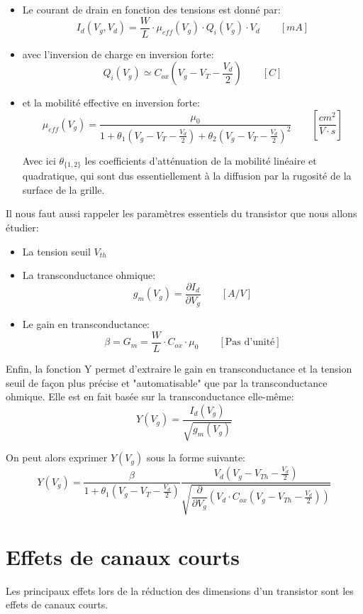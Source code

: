 \documentclass[a4paper,11pt]{report}
\begin{document}
\begin{itemize}
    \item Le courant de drain en fonction des tensions est donné par:
        \[I_d (V_g, V_d) = \frac{W}{L} \cdot \mu_{eff}(V_g) \cdot Q_i(V_g) \cdot V_d \qquad [mA]\] 
    \item avec l'inversion de charge en inversion forte:
        \[Q_i(V_g) \simeq C_{ox}(V_g - V_T - \frac{V_d}{2}) \qquad [C]\]
    \item et la mobilité effective en inversion forte:
        \[\mu_{eff}(V_g) =\frac{\mu_0}{1+\theta_1 (V_g - V_T - \frac{V_d}{2}) 
                                        +\theta_2 (V_g - V_T - \frac{V_d}{2})^2} \qquad [\frac{cm^2}{V\cdot s}] \]

        Avec ici $\theta_{\{1,2\}}$ les coefficients d'atténuation de la mobilité linéaire et quadratique, qui sont dus essentiellement à la diffusion par la rugosité de la surface de la grille. 
\end{itemize}

Il nous faut aussi rappeler les paramètres essentiels du transistor que nous allons étudier: 
\begin{itemize}
    \item La tension seuil $V_{th}$
    \item La transconductance ohmique:
        \[g_m (V_g) = \dfrac{\partial I_d}{\partial V_g} \qquad [A/V]\]
    \item Le gain en transconductance:
        \[\beta = G_m = \dfrac{W}{L} \cdot C_{ox} \cdot \mu_0 \qquad [\text{Pas d'unité}]\]
\end{itemize}

Enfin, la fonction Y permet d'extraire le gain en transconductance et la tension seuil de façon plus précise et "automatisable" que par la transconductance ohmique. Elle est en fait basée sur la transconductance elle-même:
\[ Y(V_g) = \frac{I_d(V_g)}{\sqrt{g_m(V_g)}}
\]

On peut alors exprimer $Y(V_g)$ sous la forme suivante:
\[Y(V_g) = \frac{\beta}{1+ \theta_1 (V_g - V_T - \frac{V_d}{2})} \frac{V_d (V_g - V_{Th} - \frac{V_d}{2})}{\sqrt{\dfrac{\partial}{\partial V_g}(V_d \cdot C_{ox} (V_g - V_{Th} - \frac{V_d}{2}))}}
\]

\section{Effets de canaux courts}
Les principaux effets lors de la réduction des dimensions d'un transistor sont les effets de canaux courts.
\end{document}
